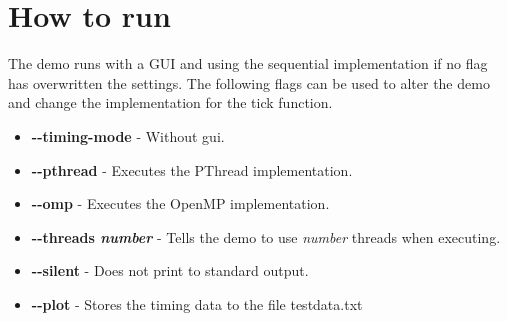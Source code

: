 \documentclass[a4paper,11pt]{article}
\begin{document}
\section{How to run}
The demo runs with a GUI and using the sequential implementation
if no flag has overwritten the settings. The following flags can be
used to alter the demo and change the implementation for the tick
function.
\begin{itemize}[label=,leftmargin=0pt]
\item \textbf{-\--timing-mode} - Without gui.
\item \textbf{-\--pthread} - Executes the PThread implementation.
\item \textbf{-\--omp} - Executes the OpenMP implementation.
\item \textbf{-\--threads \textit{number}} - Tells the demo to use
  \textit{number} threads when executing.
\item \textbf{-\--silent} - Does not print to standard output.
\item \textbf{-\--plot} - Stores the timing data to the file testdata.txt
\end{itemize}
\end{document}
